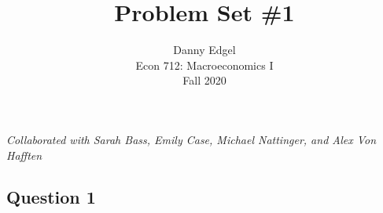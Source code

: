 \documentclass{article}
\begin{document}
\title{	Problem Set \#1 }
\author{ 	Danny Edgel 					\\ 
			Econ 712: Macroeconomics I		\\
			Fall 2020						\\
		}
\maketitle\thispagestyle{empty}


\noindent\textit{Collaborated with Sarah Bass, Emily Case, Michael Nattinger, and Alex Von Hafften}
\medskip \\

\subsection*{Question 1}
\end{document}
